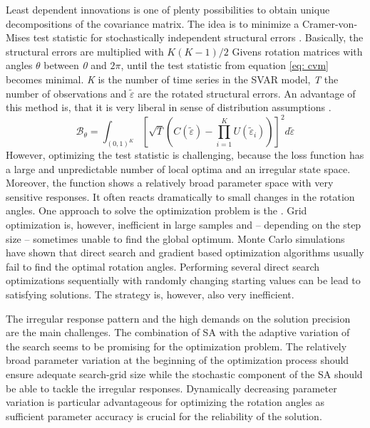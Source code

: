 Least dependent innovations is one of plenty possibilities to obtain unique decompositions of the covariance matrix. The idea is to minimize a Cramer-von-Mises test statistic for stochastically independent structural errors \citep{genest_2007}. Basically, the structural errors are multiplied with $K(K-1)/2$ Givens rotation matrices with angles $\theta$ between \textit{0} and $2\pi$, until the test statistic from equation \eqref{eq: cvm} becomes minimal. \textit{K} is the number of time series in the SVAR model, \textit{T} the number of observations and $\tilde{\varepsilon}$ are the rotated structural errors. An advantage of this method is, that it is very liberal in sense of distribution assumptions \citep{herwartz_2014}.
\begin{equation}\label{eq: cvm}
\mathcal{B}_\theta = \int_{(0,1)^K}\left[\sqrt{T}\left(C(\tilde{\varepsilon}) - \prod^K_{i = 1}U(\tilde{\varepsilon}_i)\right)\right]^2d\tilde{\varepsilon}
\end{equation}
However, optimizing the test statistic is challenging, because the loss function has a large and unpredictable number of local optima and an irregular state space. Moreover, the function shows a relatively broad parameter space with very sensitive responses. It often reacts dramatically to small changes in the rotation angles. One approach to solve the optimization problem is the  \citep{herwartz_2015}. Grid optimization is, however, inefficient in large samples and -- depending on the step size -- sometimes unable to find the global optimum. Monte Carlo simulations have shown that direct search and gradient based optimization algorithms usually fail to find the optimal rotation angles. Performing several direct search optimizations sequentially with randomly changing starting values can be lead to satisfying solutions. The strategy is, however, also very inefficient.

The irregular response pattern and the high demands on the solution precision are the main challenges. The combination of SA with the adaptive variation of the search seems to be promising for the optimization problem. The relatively broad parameter variation at the beginning of the optimization process should ensure adequate search-grid size while the stochastic component of the SA should be able to tackle the irregular responses. Dynamically decreasing parameter variation is particular advantageous for optimizing the rotation angles as sufficient parameter accuracy is crucial for the reliability of the solution.

